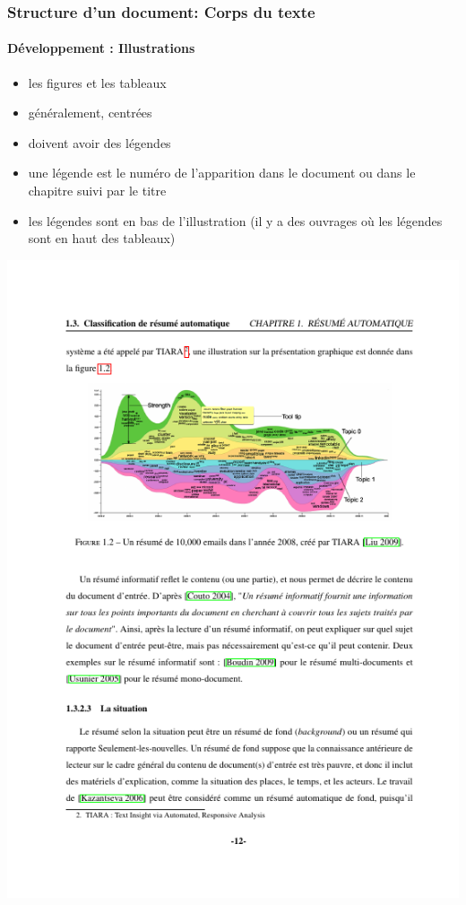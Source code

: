 \documentclass[xcolor=table]{beamer}
\begin{document}
\begin{frame}
\frametitle{Structure d'un document: Corps du texte}
\framesubtitle{Développement : Illustrations}

\begin{minipage}{0.60\textwidth}
	\begin{itemize}
		\item les figures et les tableaux
		\item généralement, centrées 
		\item doivent avoir des légendes 
		\item une légende est le numéro de l'apparition dans le document ou dans le chapitre suivi par le titre
		\item les légendes sont en bas de l'illustration (il y a des ouvrages où les légendes sont en haut des tableaux)
		
	\end{itemize}
\end{minipage}
\begin{minipage}{0.38\textwidth}
	\includegraphics[width=\textwidth,frame]{..//img/Bweb03-redaction/dev.png}
\end{minipage}

\end{frame}
\end{document}
